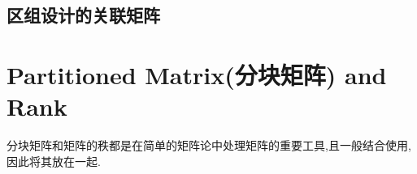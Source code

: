 \documentclass[UTF8,a4paper,notitlepage]{book}
\begin{document}
        \begin{definition}[整数矩阵]
        \end{definition}
        \begin{definition}[邻接矩阵]
        \end{definition}
        \begin{definition}[周期矩阵]
        \end{definition}
        \begin{definition}[Hadamard矩阵]
        \end{definition}
        \begin{definition}[Frobenius矩阵]%
        \end{definition}
        \subsection{区组设计的关联矩阵}
        \section{Partitioned Matrix(分块矩阵) and Rank}%
        分块矩阵和矩阵的秩都是在简单的矩阵论中处理矩阵的重要工具,且一般结合使用,因此将其放在一起.
\end{document}
